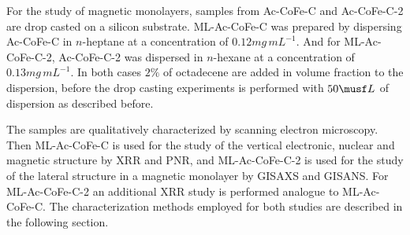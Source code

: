 \documentclass[\main/dresen_thesis.tex]{subfiles}
\begin{document}
      For the study of magnetic monolayers, samples from Ac-CoFe-C and Ac-CoFe-C-2 are drop casted on a silicon substrate.
      ML-Ac-CoFe-C was prepared by dispersing Ac-CoFe-C in $\mathit{n}$-heptane at a concentration of $0.12 \unit{mg \, mL^{-1}}$.
      And for ML-Ac-CoFe-C-2, Ac-CoFe-C-2 was dispersed in $\mathit{n}$-hexane at a concentration of $0.13 \unit{mg \, mL^{-1}}$.
      In both cases $2 \unit{\%}$ of octadecene are added in volume fraction to the dispersion, before the drop casting experiments is performed with $50 \musf L$ of dispersion as described before.

      The samples are qualitatively characterized by scanning electron microscopy.
      Then ML-Ac-CoFe-C is used for the study of the vertical electronic, nuclear and magnetic structure by XRR and PNR, and ML-Ac-CoFe-C-2 is used for the study of the lateral structure in a magnetic monolayer by GISAXS and GISANS.
      For ML-Ac-CoFe-C-2 an additional XRR study is performed analogue to ML-Ac-CoFe-C.
      The characterization methods employed for both studies are described in the following section.

\end{document}

